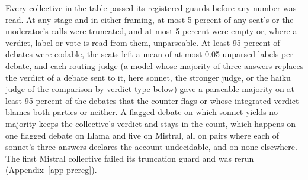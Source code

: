 Every collective in the table passed its registered guards before any number
was read. At any stage and in either framing, at most 5 percent of any seat's
or the moderator's calls were truncated, and at most 5 percent were empty or,
where a verdict, label or vote is read from them, unparseable. At least 95
percent of debates were codable, the seats left a mean of at most 0.05
unparsed labels per debate, and each routing judge (a model whose majority
of three answers replaces the verdict of a debate sent to it, here sonnet,
the stronger judge, or the haiku judge of the comparison by verdict type
below) gave a parseable majority on
at least 95 percent of the debates that the counter flags or whose integrated
verdict blames both parties or neither. A flagged debate on which sonnet
yields no majority keeps the collective's verdict and stays in the count,
which happens on one flagged debate on Llama and five on Mistral, all on
pairs where each of sonnet's three answers declares the account undecidable,
and on none elsewhere. The first
Mistral collective failed its truncation guard and was rerun
(Appendix~\ref{app-prereg}).

